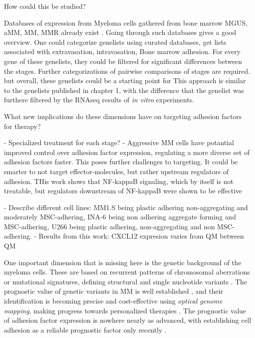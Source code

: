 How could this be studied?

Databases of expression from Myeloma cells gathered from bone
marrow \ac{MGUS}, \ac{aMM}, \ac{MM}, \ac{MMR} already exist
\citet{akhmetzyanovaDynamicCD138Surface2020,
      seckingerCD38ImmunotherapeuticTarget2018}. Going through such databases gives a
good overview. One could categorize genelists using curated databases, get lists
associated with extravasation, intravasation, Bone marrow adhesion. For every
gene of these genelists, they could be filtered for significant differences
between the stages. Further categorizations of pairwise comparisons of stages
are required. but overall, these genelists could be a starting point for This
approach is similar to the genelists published in chapter 1, with the difference
that the genelist was furthere filtered by the RNAseq results of \textit{in
      vitro} experiments.



What new implications do these dimensions have on targeting adhesion factors for
therapy?

- Specialized treatment for each stage?
- Aggressive MM cells have potantial improved control over adhesion factor expression,
regulating a more diverse set of adhesion factors faster. This poses further challenges to targeting.
It could be smarter to not target effector-molecules, but rather upstream regulators of adhesion.
THis work shows that NF-kappaB signaling, which by itself is not treatable, but regulators
downstream of NF-kappaB were shown to be effective \cite{adamikEZH2HDAC1Inhibition2017,adamikXRK3F2InhibitionP62ZZ2018}




\unnsubsection{\cadddiversitytitle}%
\label{sec:discussion_cadddiversity}%

- Describe different cell lines: MM1.S being plastic adhering non-aggregating and moderately MSC-adhering, INA-6 being non adhering aggregate forming and MSC-adhering, U266 being plastic adhering, non-aggregating and non MSC-adhering.
- Results from this work: CXCL12 expresion varies from QM between QM

One important dimension that is missing here is the genetic background of the
myeloma cells. These are based on recurrent patterns of chromosomal aberrations
or mutational signatures, defining structural and single nucleotide variants
\cite{kumarMultipleMyelomasCurrent2018a,
      hoangMutationalProcessesContributing2019}. The prognostic value of genetic
variants in MM is well established \cite{sharmaPrognosticRoleMYC2021}, and their
identification is becoming precise and cost-effective using \emph{optical
      genome mapping}, making progress towards personalized therapies
\cite{zouComprehensiveApproachEvaluate2024,
      budurleanIntegratingOpticalGenome2024}. The prognostic value of adhesion factor
expression is nowhere nearly as advanced, with establishing cell adhesion as a
reliable prognostic factor only recently
\cite{huDevelopmentCellAdhesionbased2024}.



